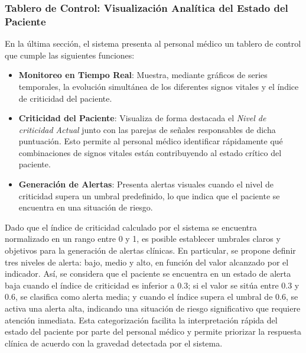 \bigskip

\subsubsection*{Tablero de Control: Visualización Analítica del Estado del Paciente}

En la última sección, el sistema presenta al personal médico un tablero de control que cumple las siguientes funciones:

\begin{itemize}
  \item \textbf{Monitoreo en Tiempo Real}: Muestra, mediante gráficos de series temporales, la evolución simultánea de los diferentes signos vitales y el índice de criticidad del paciente.
  \item \textbf{Criticidad del Paciente}: Visualiza de forma destacada el \emph{Nivel de criticidad Actual} junto con las parejas de señales responsables de dicha puntuación. Esto permite al personal médico identificar rápidamente qué combinaciones de signos vitales están contribuyendo al estado crítico del paciente.
  \item \textbf{Generación de Alertas}: Presenta alertas visuales cuando el nivel de criticidad supera un umbral predefinido, lo que indica que el paciente se encuentra en una situación de riesgo.
\end{itemize}

Dado que el índice de criticidad calculado por el sistema se encuentra normalizado en un rango entre 0 y 1, es posible establecer umbrales claros y objetivos para la generación de alertas clínicas. En particular, se propone definir tres niveles de alerta: bajo, medio y alto, en función del valor alcanzado por el indicador. Así, se considera que el paciente se encuentra en un estado de alerta baja cuando el índice de criticidad es inferior a 0.3; si el valor se sitúa entre 0.3 y 0.6, se clasifica como alerta media; y cuando el índice supera el umbral de 0.6, se activa una alerta alta, indicando una situación de riesgo significativo que requiere atención inmediata. Esta categorización facilita la interpretación rápida del estado del paciente por parte del personal médico y permite priorizar la respuesta clínica de acuerdo con la gravedad detectada por el sistema.
